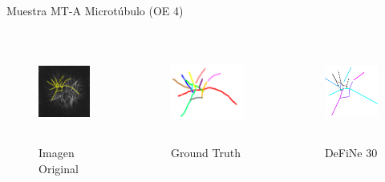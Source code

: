\begin{frame}{Muestra MT-A Microt\'ubulo (OE 4)}
\vspace{-1cm}
    \begin{columns}
        \begin{column}{0.22\textwidth}
            \begin{figure}
                \centering
                \includegraphics[height=1.3in]{Pictures/SPINNING-DISK-MARCHANTIA-rois-unlabeled.png}
                \caption{Imagen Original}
            \end{figure}
        \end{column}
        \begin{column}{0.22\textwidth}
            \begin{figure}
                \centering
                \includegraphics[height=1.3in]{Pictures/50-ROIs-Spinning-Marchantia-solved-rot-unlabeled.png}
                \caption{Ground Truth}
            \end{figure}
        \end{column}
        \begin{column}{0.22\textwidth}
            \begin{figure}
                \centering
                \includegraphics[height=1.3in]{Pictures/50-ROIs-Spinning-Marchantia-DeFiNeExactMatch-30.png}
                \caption{DeFiNe 30\textdegree}
            \end{figure}
        \end{column}

\end{columns}
\end{frame}
